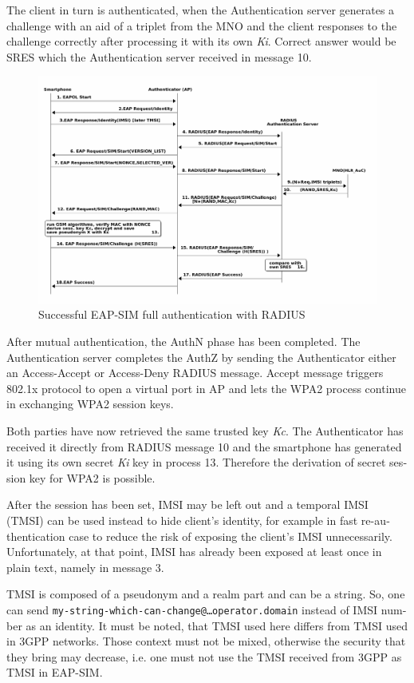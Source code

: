 \documentclass[12pt,a4paper,english]{tutthesis}
\begin{document}
\begin{otherlanguage}{english}
The client in turn is authenticated, when the Authentication server
generates a challenge with an aid of a triplet from the MNO and the
client responses to the challenge correctly after processing it with
its own \emph{Ki}.  Correct answer would be SRES which the Authentication
server received in message 10.
\begin{figure}[htb]
\centering
\includegraphics[width=.9\linewidth]{eap-sim-radius.png}
\caption{\label{fig:eap-sim-radius}Successful EAP-SIM full authentication with RADIUS}
\end{figure}



After mutual authentication, the AuthN phase has been completed. The
Authentication server completes the AuthZ by sending the Authenticator either
an Access-Accept or Access-Deny RADIUS message. 
Accept message triggers 802.1x protocol to open a virtual port in AP
and lets the WPA2 process continue in exchanging WPA2 session keys. 

Both parties have now retrieved the same trusted key \emph{Kc}. The
Authenticator has received it directly from RADIUS message 10 and the
smartphone has generated it using its own secret \emph{Ki} key in
process 13.
Therefore the derivation of secret session key for WPA2 is possible.

After the session has been set, IMSI may be left out and a temporal IMSI
(TMSI) can be used instead to hide client's identity, for example in
fast re-authentication case to reduce the risk of exposing the client's
IMSI unnecessarily. Unfortunately, at that point, IMSI has already
been exposed at least once in plain text, namely in message 3.

TMSI is composed of a pseudonym and a realm part and can be a
string. So, one can send 
\texttt{my-string-which-can-change@…operator.domain} instead of 
IMSI number as an identity. 
It must be noted, that TMSI used here differs from TMSI used in 3GPP
networks. Those context must not be mixed, otherwise the security that
they bring may decrease, i.e. one must not use the TMSI received from
3GPP as TMSI in EAP-SIM.

\end{otherlanguage}
\end{document}
